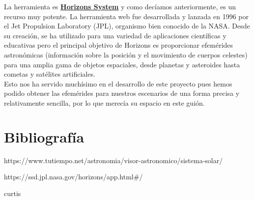 \documentclass{article}
\numberwithin{equation}{section}
\begin{document}
La herramienta es \href{https://ssd.jpl.nasa.gov/horizons/app.html#/}{\textbf{Horizons System}}
y como decíamos anteriormente, es un recurso muy potente. La herramienta web fue desarrollada y lanzada en 1996 por el Jet Propulsion Laboratory (JPL), organismo bien conocido de la NASA. Desde su creación, se ha utilizado para una variedad de aplicaciones científicas y educativas pero el principal objetivo de Horizons es proporcionar efemérides astronómicas (información sobre la posición y el movimiento de cuerpos celestes) para una amplia gama de objetos espaciales, desde planetas y asteroides hasta cometas y satélites artificiales.\\

Esto nos ha servido muchísimo en el desarrollo de este proyecto pues hemos podido obtener las efemérides para nuestros escenarios de una forma precisa y relativamente sencilla, por lo que merecía su espacio en este guión.


\section{Bibliografía}

https://www.tutiempo.net/astronomia/visor-astronomico/sistema-solar/

https://ssd.jpl.nasa.gov/horizons/app.html#/

curtis
\end{document}
